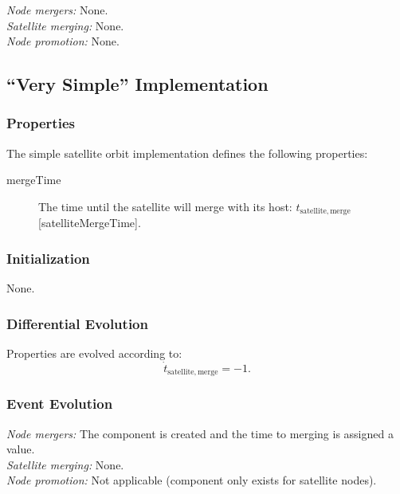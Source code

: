 \noindent\emph{Node mergers:} None.\\

\noindent\emph{Satellite merging:} None.\\

\noindent\emph{Node promotion:} None.\\

\subsection{``Very Simple'' Implementation}

\subsubsection{Properties}

The simple satellite orbit implementation defines the following properties:
\begin{description}
 \item [{\normalfont \ttfamily mergeTime}] The time until the satellite will merge with its host: $t_\mathrm{satellite, merge}$ [{\normalfont \ttfamily satelliteMergeTime}].
\end{description}

\subsubsection{Initialization}

None.

\subsubsection{Differential Evolution}

Properties are evolved according to:
\begin{equation}
 \dot{t}_\mathrm{satellite, merge} = -1.
\end{equation}

\subsubsection{Event Evolution}

\noindent\emph{Node mergers:} The \gls{component} is created and the time to merging is assigned a value.\\

\noindent\emph{Satellite merging:} None.\\

\noindent\emph{Node promotion:} Not applicable (component only exists for satellite nodes).\\

